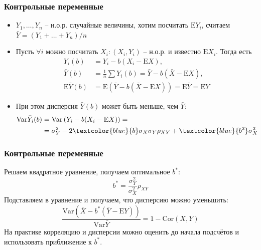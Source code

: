 \documentclass[unicode, notheorems]{beamer}
\newcommand{\E}{\mathrm{E}}
\begin{document}
	\label{sub:control_variate}
	\begin{frame}
	\frametitle{Контрольные переменные} 
		\begin{itemize}
			\item $Y_1, \ldots, Y_n$ -- н.о.р. случайные величины, хотим посчитать $\E Y_i$, считаем $\bar Y = (Y_1 + \ldots + Y_n) / n$
			\item Пусть $\forall i$ можно посчитать $X_i: \left(X_i, Y_i\right)$ -- н.о.р. и известно $\E X_i$. Тогда есть
				\begin{align*}
					Y_i(b) &= Y_i - b(X_i - \E X), \\
					\bar Y(b) &= \frac{1}{n}\sum Y_i(b) = \bar Y - b(\bar X - \E X), \\
					\E \bar Y(b) &= \E\left(\bar Y - b(\bar X - \E X)\right) = \E \bar Y = \E Y
				\end{align*}
			\item<2-> При этом дисперсия $\bar Y(b)$ может быть меньше, чем $\bar Y$:
				\begin{align*}
					\mathrm{Var} \bar Y_i(b) &= \mathrm{Var}\left(Y_i - b(X_i - \E X)\right) = \\
					&= \sigma_Y^2 - 2\textcolor{blue}{b}\sigma_X \sigma_Y \rho_{XY} + \textcolor{blue}{b^2}\sigma_X^2
				\end{align*}
		\end{itemize}
	\end{frame}

	\begin{frame}
	\frametitle{Контрольные переменные}
		Решаем квадратное уравнение, получаем оптимальное $b^*$:
		$$b^* = \frac{\sigma^2_Y}{\sigma^2_X}\rho_{XY}$$
		Подставляем в уравнение и получаем, что дисперсию можно уменьшить:
		$$\frac{\mathrm{Var}\left(\bar X - b^*\left(\bar Y - \E Y\right)\right)}{\mathrm{Var} \bar Y} = 1 - \mathrm{Cor}\left(X, Y\right)$$
		На практике корреляцию и дисперсии можно оценить до начала подсчётов и использовать приближение к $b^*$.
	\end{frame}
\end{document}

